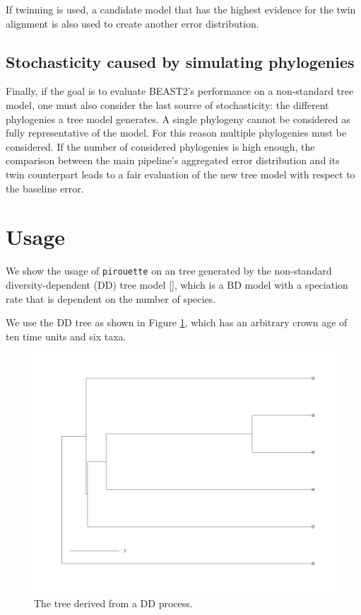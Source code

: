 If twinning is used, a candidate model that has the highest evidence for
the twin alignment is also used to create another error
distribution.

\subsection{Stochasticity caused by simulating phylogenies}

Finally, if the goal is to evaluate BEAST2's performance 
on a non-standard tree model, 
one must also consider the last source of stochasticity: 
the different phylogenies a tree model generates.
A single phylogeny cannot be considered as fully representative of the model. 
For this reason multiple phylogenies must be considered. 
If the number of considered phylogenies is high enough, 
the comparison between the main pipeline's aggregated error distribution 
and its twin counterpart leads to a fair evaluation 
of the new tree model with respect to the baseline error.

\section{Usage}

We show the usage of \verb;pirouette; on an tree generated 
by the non-standard diversity-dependent (DD) tree model [\citep{etienne2020package, etienne2012diversity}],
which is a BD model with a speciation rate that is dependent on the number of species.

We use the DD tree as shown in Figure \ref{fig:dd_tree},
which has an arbitrary crown age of ten time units
and six taxa.

\begin{figure}[H]
  \includegraphics[width=\textwidth]{pirouette_example_30/example_30_314/true_tree.png}
  \caption{
    The tree derived from a DD process.
  }
  \label{fig:dd_tree}
\end{figure}

